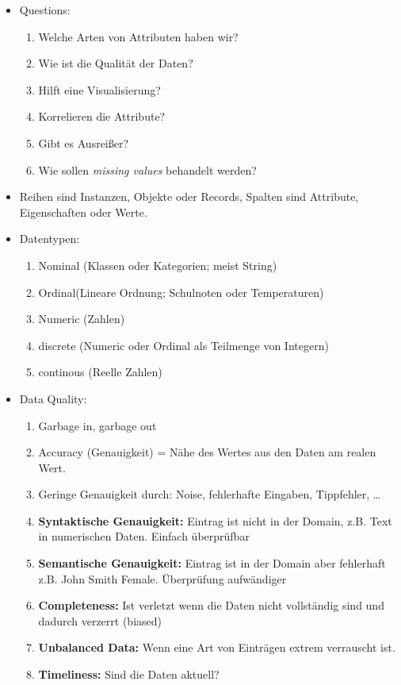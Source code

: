\documentclass[a4paper]{scrartcl}
\begin{document}
\begin{itemize}
\item Questions:
	\begin{enumerate}
	\item Welche Arten von Attributen haben wir?
	\item Wie ist die Qualität der Daten?
	\item Hilft eine Visualisierung?
	\item Korrelieren die Attribute?
	\item Gibt es Ausreißer?
	\item Wie sollen \textit{missing values} behandelt werden?
	\end{enumerate}
\item Reihen sind Instanzen, Objekte oder Records, Spalten sind Attribute, Eigenschaften oder Werte.
\item Datentypen:
	\begin{enumerate}
	\item Nominal (Klassen oder Kategorien; meist String)
	\item Ordinal(Lineare Ordnung; Schulnoten oder Temperaturen)
	\item Numeric (Zahlen)
	\item discrete (Numeric oder Ordinal als Teilmenge von Integern)
	\item continous (Reelle Zahlen)
	\end{enumerate}
\item Data Quality:
	\begin{enumerate}
		\item Garbage in, garbage out
		\item Accuracy (Genauigkeit) = Nähe des Wertes aus den Daten am realen Wert.
		\item Geringe Genauigkeit durch: Noise, fehlerhafte Eingaben, Tippfehler, \dots
		\item \textbf{Syntaktische Genauigkeit:} Eintrag ist nicht in der Domain, z.B. Text in numerischen Daten. Einfach überprüfbar
		\item \textbf{Semantische Genauigkeit:} Eintrag ist in der Domain aber fehlerhaft z.B. John Smith Female. Überprüfung aufwändiger
		\item \textbf{Completeness:} Ist verletzt wenn die Daten nicht vollständig sind und dadurch verzerrt (biased)
		\item \textbf{Unbalanced Data:} Wenn eine Art von Einträgen extrem verrauscht ist.
		\item \textbf{Timeliness:} Sind die Daten aktuell?
	\end{enumerate}
\end{itemize}
\end{document}
